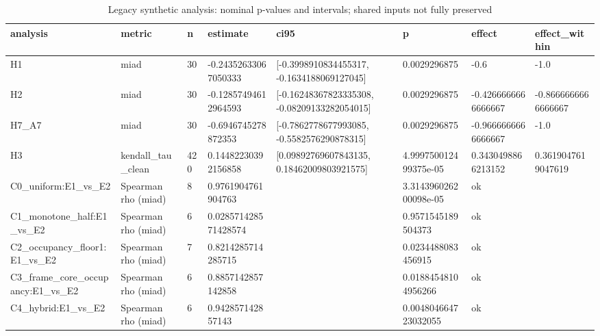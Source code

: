 \begin{table}
\caption{Legacy synthetic analysis: nominal p-values and intervals; shared inputs not fully preserved}
\label{tab:synthetic\_statistics}
\begin{tabular}{llllllll}
\toprule
analysis & metric & n & estimate & ci95 & p & effect & effect\_within \\
\midrule
H1 & miad & 30 & -0.24352633067050333 & [-0.3998910834455317, -0.1634188069127045] & 0.0029296875 & -0.6 & -1.0 \\
H2 & miad & 30 & -0.12857494612964593 & [-0.16248367823335308, -0.08209133282054015] & 0.0029296875 & -0.4266666666666667 & -0.8666666666666667 \\
H7\_A7 & miad & 30 & -0.6946745278872353 & [-0.7862778677993085, -0.5582576290878315] & 0.0029296875 & -0.9666666666666667 & -1.0 \\
H3 & kendall\_tau\_clean & 420 & 0.14482230392156858 & [0.09892769607843135, 0.18462009803921575] & 4.999750012499375e-05 & 0.3430498866213152 & 0.3619047619047619 \\
C0\_uniform:E1\_vs\_E2 & Spearman rho (miad) & 8 & 0.9761904761904763 &  & 3.314396026200098e-05 & ok &  \\
C1\_monotone\_half:E1\_vs\_E2 & Spearman rho (miad) & 6 & 0.028571428571428574 &  & 0.9571545189504373 & ok &  \\
C2\_occupancy\_floor1:E1\_vs\_E2 & Spearman rho (miad) & 7 & 0.8214285714285715 &  & 0.0234488083456915 & ok &  \\
C3\_frame\_core\_occupancy:E1\_vs\_E2 & Spearman rho (miad) & 6 & 0.8857142857142858 &  & 0.01884548104956266 & ok &  \\
C4\_hybrid:E1\_vs\_E2 & Spearman rho (miad) & 6 & 0.942857142857143 &  & 0.004804664723032055 & ok &  \\
\bottomrule
\end{tabular}
\end{table}
